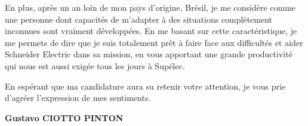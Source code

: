 \documentclass[12pt, a4paper]{article}
\newcommand{\entreprise}{Schneider Electric }
\begin{document}
\vspace{12pt}

En plus, après un an loin de mon pays d'origine, Brésil, je me considère comme
une personne dont capacités de m'adapter à des situations complètement
inconnues sont vraiment développées. En me basant sur cette caractéristique, je
me permets de dire que je suis totalement prêt à faire face aux difficultés et
aider \entreprise dans sa mission, en vous apportant une grande productivité
qui nous est aussi exigée tous les jours à Supélec.

\vspace{12pt}

En espérant que ma candidature aura su retenir votre attention, je vous prie
d'agréer l'expression de mes sentiments.

\vspace{12pt}

\textbf{Gustavo CIOTTO PINTON}
\end{document}
